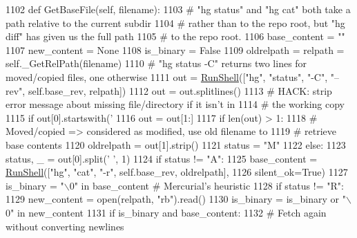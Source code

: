 \begin{DoxyCode}
1102   \textcolor{keyword}{def }GetBaseFile(self, filename):
1103     \textcolor{comment}{# "hg status" and "hg cat" both take a path relative to the current subdir}
1104     \textcolor{comment}{# rather than to the repo root, but "hg diff" has given us the full path}
1105     \textcolor{comment}{# to the repo root.}
1106     base\_content = \textcolor{stringliteral}{""}
1107     new\_content = \textcolor{keywordtype}{None}
1108     is\_binary = \textcolor{keyword}{False}
1109     oldrelpath = relpath = self.\_GetRelPath(filename)
1110     \textcolor{comment}{# "hg status -C" returns two lines for moved/copied files, one otherwise}
1111     out = \hyperlink{namespaceupload_adddc423c49132e8879cbb25d6be2cf11}{RunShell}([\textcolor{stringliteral}{"hg"}, \textcolor{stringliteral}{"status"}, \textcolor{stringliteral}{"-C"}, \textcolor{stringliteral}{"--rev"}, self.base\_rev, relpath])
1112     out = out.splitlines()
1113     \textcolor{comment}{# HACK: strip error message about missing file/directory if it isn't in}
1114     \textcolor{comment}{# the working copy}
1115     \textcolor{keywordflow}{if} out[0].startswith(\textcolor{stringliteral}{'%
1116       out = out[1:]
1117     \textcolor{keywordflow}{if} len(out) > 1:
1118       \textcolor{comment}{# Moved/copied => considered as modified, use old filename to}
1119       \textcolor{comment}{# retrieve base contents}
1120       oldrelpath = out[1].strip()
1121       status = \textcolor{stringliteral}{"M"}
1122     \textcolor{keywordflow}{else}:
1123       status, \_ = out[0].split(\textcolor{stringliteral}{' '}, 1)
1124     \textcolor{keywordflow}{if} status != \textcolor{stringliteral}{"A"}:
1125       base\_content = \hyperlink{namespaceupload_adddc423c49132e8879cbb25d6be2cf11}{RunShell}([\textcolor{stringliteral}{"hg"}, \textcolor{stringliteral}{"cat"}, \textcolor{stringliteral}{"-r"}, self.base\_rev, oldrelpath],
1126         silent\_ok=\textcolor{keyword}{True})
1127       is\_binary = \textcolor{stringliteral}{"\(\backslash\)0"} \textcolor{keywordflow}{in} base\_content  \textcolor{comment}{# Mercurial's heuristic}
1128     \textcolor{keywordflow}{if} status != \textcolor{stringliteral}{"R":}
1129 \textcolor{stringliteral}{      new\_content = open(relpath, "rb"}).read()
1130       is\_binary = is\_binary \textcolor{keywordflow}{or} \textcolor{stringliteral}{"\(\backslash\)0"} \textcolor{keywordflow}{in} new\_content
1131     \textcolor{keywordflow}{if} is\_binary \textcolor{keywordflow}{and} base\_content:
1132       \textcolor{comment}{# Fetch again without converting newlines}
}
\end{DoxyCode}
